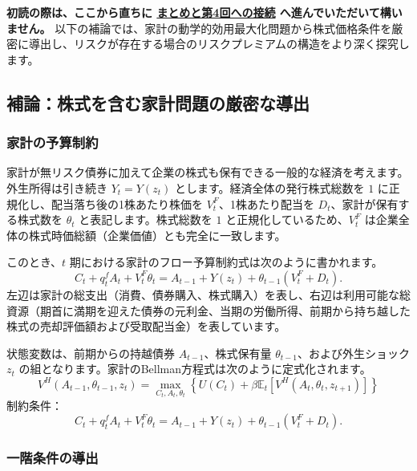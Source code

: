\documentclass[
  japanese,
  lualatex,
  ja=standard,
  12pt,
  a4paper]{ltjsarticle}
\begin{document}
\textbf{初読の際は、ここから直ちに
\hyperref[sec-lecture03-bridge]{まとめと第4回への接続}
へ進んでいただいて構いません。}
以下の補論では、家計の動学的効用最大化問題から株式価格条件を厳密に導出し、リスクが存在する場合のリスクプレミアムの構造をより深く探究します。

\subsection{補論：株式を含む家計問題の厳密な導出}\label{ux88dcux8ad6ux682aux5f0fux3092ux542bux3080ux5bb6ux8a08ux554fux984cux306eux53b3ux5bc6ux306aux5c0eux51fa}

\subsubsection{家計の予算制約}\label{ux5bb6ux8a08ux306eux4e88ux7b97ux5236ux7d04}

家計が無リスク債券に加えて企業の株式も保有できる一般的な経済を考えます。外生所得は引き続き
\(Y_t = Y(z_t)\) とします。経済全体の発行株式総数を \(1\)
に正規化し、配当落ち後の1株あたり株価を \(V_t^F\)、1株あたり配当を
\(D_t\)、家計が保有する株式数を \(\theta_t\) と表記します。株式総数を
\(1\) と正規化しているため、\(V_t^F\)
は企業全体の株式時価総額（企業価値）とも完全に一致します。

このとき、\(t\) 期における家計のフロー予算制約式は次のように書かれます。
\[
C_t + q_t^f A_t + V_t^F \theta_t = A_{t-1} + Y(z_t) + \theta_{t-1} (V_t^F + D_t).
\]
左辺は家計の総支出（消費、債券購入、株式購入）を表し、右辺は利用可能な総資源（期首に満期を迎えた債券の元利金、当期の労働所得、前期から持ち越した株式の売却評価額および受取配当金）を表しています。

状態変数は、前期からの持越債券 \(A_{t-1}\)、株式保有量
\(\theta_{t-1}\)、および外生ショック \(z_t\)
の組となります。家計のBellman方程式は次のように定式化されます。 \[
V^H(A_{t-1}, \theta_{t-1}, z_t) = \max_{C_t, A_t, \theta_t} \left\{ U(C_t) + \beta \mathbb{E}_t \left[ V^H(A_t, \theta_t, z_{t+1}) \right] \right\}
\] 制約条件： \[
C_t + q_t^f A_t + V_t^F \theta_t = A_{t-1} + Y(z_t) + \theta_{t-1} (V_t^F + D_t).
\]

\subsubsection{一階条件の導出}\label{ux4e00ux968eux6761ux4ef6ux306eux5c0eux51fa}
\end{document}
